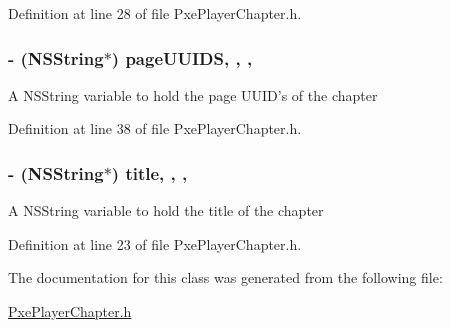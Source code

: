 Definition at line 28 of file Pxe\-Player\-Chapter.\-h.

\hypertarget{interface_pxe_player_chapter_a2671676800d397a2a4311ddee7f69b88}{
\subsubsection[{page\-U\-U\-I\-D\-S}]{\setlength{\rightskip}{0pt plus 5cm}-\/ (N\-S\-String$\ast$) page\-U\-U\-I\-D\-S\hspace{0.3cm}{\ttfamily [read]}, {\ttfamily [write]}, {\ttfamily [nonatomic]}, {\ttfamily [strong]}}}\label{interface_pxe_player_chapter_a2671676800d397a2a4311ddee7f69b88}
A N\-S\-String variable to hold the page U\-U\-I\-D's of the chapter 

Definition at line 38 of file Pxe\-Player\-Chapter.\-h.

\hypertarget{interface_pxe_player_chapter_a43ac97bc7f0f1875aca6f964b5e6c9a2}{
\subsubsection[{title}]{\setlength{\rightskip}{0pt plus 5cm}-\/ (N\-S\-String$\ast$) title\hspace{0.3cm}{\ttfamily [read]}, {\ttfamily [write]}, {\ttfamily [nonatomic]}, {\ttfamily [strong]}}}\label{interface_pxe_player_chapter_a43ac97bc7f0f1875aca6f964b5e6c9a2}
A N\-S\-String variable to hold the title of the chapter 

Definition at line 23 of file Pxe\-Player\-Chapter.\-h.



The documentation for this class was generated from the following file\-:\begin{DoxyCompactItemize}
\item 
\hyperlink{_pxe_player_chapter_8h}{Pxe\-Player\-Chapter.\-h}\end{DoxyCompactItemize}
